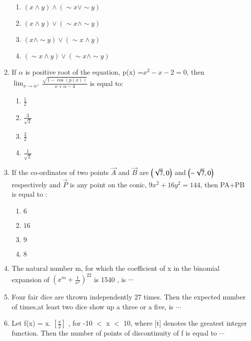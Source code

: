 \documentclass[journal]{IEEEtran}
\numberwithin{equation}{enumi}
\numberwithin{figure}{enumi}
\begin{document}
\begin{enumerate}
    \begin{enumerate}
        \item $(x \land y) \land (\sim x \lor \sim y)$
        \item $(x \land y) \lor (\sim x \land \sim y)$
        \item $(x \land \sim y) \lor (\sim x \land  y)$
        \item $(\sim x \land y) \lor (\sim x \land \sim y)$
    \end{enumerate}
    \item If $\alpha$ is positive root of the equation, p(x) =$x^2-x-2=0$, then $\lim_{x \to \alpha^+} \frac{\sqrt{1 - \cos{(p(x))}}}{x + \alpha - 4}$ is equal to: \\
    \begin{multicols}{4}
    \begin{enumerate}
        \item $\frac{1}{2}$
        \item $\frac{3}{\sqrt{2}}$
        \item $\frac{3}{2}$
        \item $\frac{1}{\sqrt{2}}$
    \end{enumerate} 
    \end{multicols}
    \item If the co-ordinates of two points $\vec{A}$ and $\vec{B}$ are $\left(\sqrt{7},0\right)$ and $\left(-\sqrt{7},0\right)$respectively and $\vec{P}$ is any point on the conic, $9x^2+16y^2=144$, then PA+PB is equal to : \\
    \begin{multicols}{4}
    \begin{enumerate}
        \item $6$
        \item $16$
        \item $9$
        \item $8$
    \end{enumerate} 
    \end{multicols}
    \item The natural number m, for which the coefficient of x in the binomial expansion of ${\left(x^m + \frac{1}{x^2}\right)}^{22}$ is 1540 , is $\cdots$ \\
    \item Four fair dice are thrown independently 27 times. Then the expected number of times,at least two dice show up a three or a five, is $\cdots$ \\
    \item Let f(x) = x. $\left[\frac{x}{2}\right]$ , for -10 $<$ x $<$ 10, where [t] denotes the greatest integer function. Then the number of points of discontinuity of f is equal to $\cdots$ \\

\end{enumerate}
\end{document}
